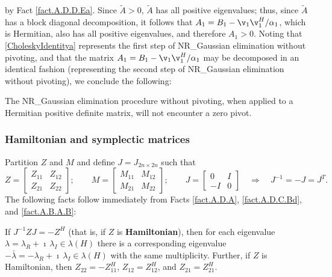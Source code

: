 by Fact \ref{fact.A.D.D.Ea}.  Since $\tilde A>0$, $\tilde A$ has all positive eigenvalues; thus, since $\tilde A$ has a block diagonal decomposition,
it follows that $A_1=B_1-\v_1 \v_1^H/ \alpha_1$, which is Hermitian, also has all positive eigenvalues, and therefore $A_1>0$.  Noting that \eqref{CholeskyIdentitya}
represents the first step of NR_Gaussian elimination without pivoting, and that the matrix $A_1=B_1-\v_1 \v_1^H/ \alpha_1$ may be decomposed in an identical fashion (representing
the second step of NR_Gaussian elimination without pivoting), we conclude the following:

\begin{fact} \label{fact.A.D.D.Eg}
The NR_Gaussian elimination procedure without pivoting, when applied to a Hermitian positive definite matrix, will not encounter a zero pivot.
\end{fact}

\subsubsection{Hamiltonian and symplectic matrices} \label{sec.A.D.D.B}

Partition $Z$ and $M$ and define $J=J_{2n\times 2n}$ such that
\begin{equation*}
Z = \begin{bmatrix} Z_{11} & Z_{12} \\ Z_{21} & Z_{22} \end{bmatrix}; \qquad
M = \begin{bmatrix} M_{11} & M_{12} \\ M_{21} & M_{22} \end{bmatrix}; \qquad
J = \begin{bmatrix} 0 & I \\ -I & 0 \end{bmatrix} \quad \Rightarrow \quad J^{-1} = - J = J^T.
\end{equation*}
The following facts follow immediately from Facts \ref{fact.A.D.A}, \ref{fact.A.D.C.Bd}, and \ref{fact.A.B.A.B}:

\begin{fact} \label{fact.A.D.D.Ec}
If $J^{-1} Z J = -Z^H$ (that is, if $Z$ is {\bf Hamiltonian}),
then for each eigenvalue $\lambda= \lambda_{R}+\imath\,\lambda_{I} \in \lambda(H)$
there is a corresponding eigenvalue $-\bar\lambda = -\lambda_{R}+\imath\,\lambda_{I} \in \lambda(H)$
with the same multiplicity.  Further, if $Z$ is Hamiltonian, then $Z_{22}=-Z_{11}^H$, $Z_{12}=Z_{12}^H$, and $Z_{21}=Z_{21}^H$.
\end{fact}

